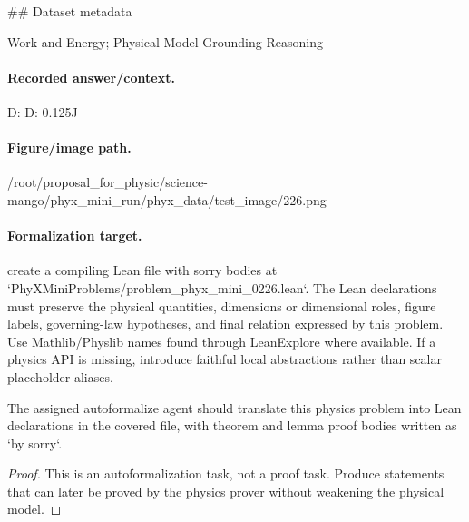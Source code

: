 \#\# Dataset metadata

Work and Energy; Physical Model Grounding Reasoning

\paragraph{Recorded answer/context.}
D: D: 0.125J

\paragraph{Figure/image path.}
/root/proposal\_for\_physic/science-mango/phyx\_mini\_run/phyx\_data/test\_image/226.png

\paragraph{Formalization target.}
create a compiling Lean file with sorry bodies at `PhyXMiniProblems/problem\_phyx\_mini\_0226.lean`. The Lean declarations must preserve the physical quantities, dimensions or dimensional roles, figure labels, governing-law hypotheses, and final relation expressed by this problem.
Use Mathlib/Physlib names found through LeanExplore where available. If a physics API is missing, introduce faithful local abstractions rather than scalar placeholder aliases.

\begin{theorem}
\label{thm:physics:phyx_mini_0226:target}
The assigned autoformalize agent should translate this physics problem into Lean declarations in the covered file, with theorem and lemma proof bodies written as `by sorry`.
\end{theorem}
\begin{proof}
This is an autoformalization task, not a proof task. Produce statements that can later be proved by the physics prover without weakening the physical model.
\end{proof}

